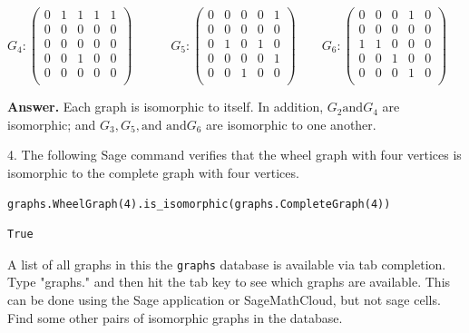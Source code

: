 \documentclass[10pt,]{book}
\theoremstyle{plain}
\theoremstyle{definition}
\theoremstyle{definition}
\theoremstyle{definition}
\theoremstyle{definition}
\theoremstyle{definition}
\numberwithin{equation}{section}
\begin{document}
\begin{exercisegroup}
 \(G_4: \left(
\begin{array}{ccccc}
 0 & 1 & 1 & 1 & 1 \\
 0 & 0 & 0 & 0 & 0 \\
 0 & 0 & 0 & 0 & 0 \\
 0 & 0 & 1 & 0 & 0 \\
 0 & 0 & 0 & 0 & 0 \\
\end{array}
\right)\)\(\quad \quad\)\(\quad G_5: \left(
\begin{array}{ccccc}
 0 & 0 & 0 & 0 & 1 \\
 0 & 0 & 0 & 0 & 0 \\
 0 & 1 & 0 & 1 & 0 \\
 0 & 0 & 0 & 0 & 1 \\
 0 & 0 & 1 & 0 & 0 \\
\end{array}
\right)\)\(\quad \quad\)\(G_6: \left(
\begin{array}{ccccc}
 0 & 0 & 0 & 1 & 0 \\
 0 & 0 & 0 & 0 & 0 \\
 1 & 1 & 0 & 0 & 0 \\
 0 & 0 & 1 & 0 & 0 \\
 0 & 0 & 0 & 1 & 0 \\
\end{array}
\right)\)%
\par\smallskip
\par\smallskip
\noindent\textbf{Answer.}\hypertarget{answer-2}{}\quad
 Each graph is isomorphic to itself. In addition, \(G_2 \text{and} G_4\) are isomorphic; and \(G_3,G_5, \text{and and} G_6\) are isomorphic to one another.%
\item[4.]\hypertarget{exercise-15}{} The following Sage command verifies that the wheel graph with four vertices is isomorphic to the complete graph with four vertices. %
\begin{lstlisting}[style=sageinput]
graphs.WheelGraph(4).is_isomorphic(graphs.CompleteGraph(4))
\end{lstlisting}
\begin{lstlisting}[style=sageoutput]
True
\end{lstlisting}
\par
A list of all graphs in this the \lstinline?graphs? database is available via tab
   completion. Type "graphs." and then hit the tab key to see which
   graphs are available.  This can be done using the Sage application or SageMathCloud, but not sage cells.  Find some other pairs of isomorphic graphs in the database.%
\par\smallskip
\end{exercisegroup}
\par\smallskip\noindent
\typeout{************************************************}
\typeout{************************************************}
\end{document}
